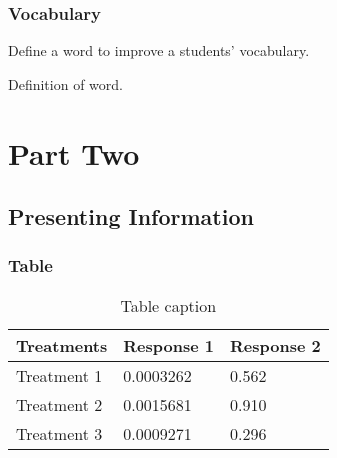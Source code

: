 \documentclass[11pt,fleqn]{book} %
\begin{document}

\section{Vocabulary}

Define a word to improve a students' vocabulary.

\begin{vocabulary}[Word]
Definition of word.
\end{vocabulary}


\part{Part Two}


  \begin{figure}
        \centering
    \end{figure}


\chapter{Presenting Information}

\section{Table}

\begin{table}[h]
\centering
\begin{tabular}{l l l}
\toprule
\textbf{Treatments} & \textbf{Response 1} & \textbf{Response 2}\\
\midrule
Treatment 1 & 0.0003262 & 0.562 \\
Treatment 2 & 0.0015681 & 0.910 \\
Treatment 3 & 0.0009271 & 0.296 \\
\bottomrule
\end{tabular}
\caption{Table caption}
\label{tab:example} %
\end{table}
\end{document}
